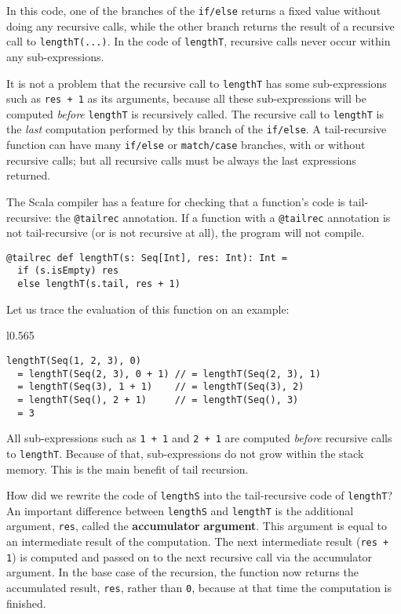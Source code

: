 \noindent In this code, one of the branches of the \lstinline!if/else!
returns a fixed value without doing any recursive calls, while the
other branch returns the result of a recursive call to \lstinline!lengthT(...)!.
In the code of \lstinline!lengthT!, recursive calls never occur within
any sub-expressions.

It is not a problem that the recursive call to \lstinline!lengthT!
has some sub-expressions such as \lstinline!res + 1! as its arguments,
because all these sub-expressions will be computed \emph{before} \lstinline!lengthT!
is recursively called. The recursive call to \lstinline!lengthT!
is the \emph{last} computation performed by this branch of the \lstinline!if/else!.
A tail-recursive function can have many \lstinline!if/else! or \lstinline!match/case!
branches, with or without recursive calls; but all recursive calls
must be always the last expressions returned.

The Scala compiler has a feature for checking that a function\textsf{'}s code
is tail-recursive: the \lstinline!@tailrec! annotation. If a function
with a \lstinline!@tailrec! annotation is not tail-recursive (or
is not recursive at all), the program will not compile.
\begin{lstlisting}
@tailrec def lengthT(s: Seq[Int], res: Int): Int = 
  if (s.isEmpty) res
  else lengthT(s.tail, res + 1)
\end{lstlisting}
Let us trace the evaluation of this function on an example:

\begin{wrapfigure}{l}{0.565\columnwidth}%
\vspace{-0.8\baselineskip}
\begin{lstlisting}
lengthT(Seq(1, 2, 3), 0)
  = lengthT(Seq(2, 3), 0 + 1) // = lengthT(Seq(2, 3), 1)
  = lengthT(Seq(3), 1 + 1)    // = lengthT(Seq(3), 2)
  = lengthT(Seq(), 2 + 1)     // = lengthT(Seq(), 3)
  = 3
\end{lstlisting}

\vspace{-1.5\baselineskip}
\end{wrapfigure}%

\noindent All sub-expressions such as \lstinline!1 + 1! and \lstinline!2 + 1!
are computed \emph{before} recursive calls to \lstinline!lengthT!.
Because of that, sub-expressions do not grow within the stack memory.
This is the main benefit of tail recursion.

How did we rewrite the code of \lstinline!lengthS! into the tail-recursive
code of \lstinline!lengthT!? An important difference between \lstinline!lengthS!
and \lstinline!lengthT! is the additional argument, \lstinline!res!,
called the \textbf{accumulator}
\textbf{argument}. This argument is equal to an intermediate result
of the computation. The next intermediate result (\lstinline!res + 1!)
is computed and passed on to the next recursive call via the accumulator
argument. In the base case of the recursion, the function now returns
the accumulated result, \lstinline!res!, rather than \lstinline!0!,
because at that time the computation is finished.

